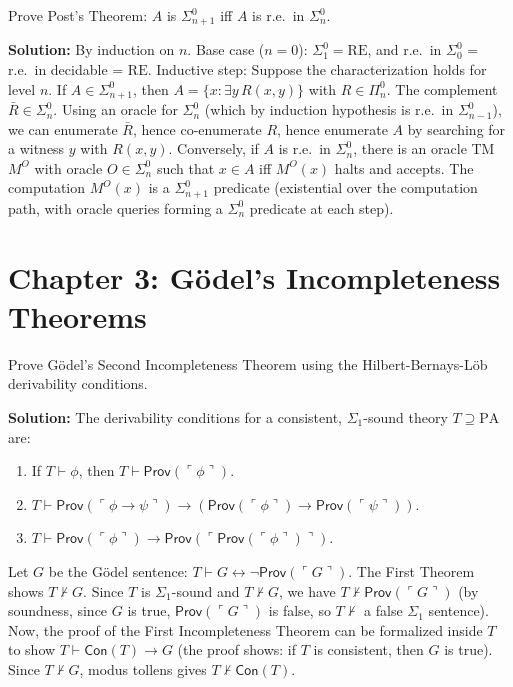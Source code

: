 \begin{exercise}[Challenge]
Prove Post's Theorem: $A$ is $\Sigma_{n+1}^0$ iff $A$ is r.e.\ in $\Sigma_n^0$.
\end{exercise}
\textbf{Solution:} By induction on $n$. Base case ($n=0$): $\Sigma_1^0 = \mathrm{RE}$, and r.e.\ in $\Sigma_0^0$ = r.e.\ in decidable = $\mathrm{RE}$. Inductive step: Suppose the characterization holds for level $n$. If $A \in \Sigma_{n+1}^0$, then $A = \{x : \exists y \, R(x,y)\}$ with $R \in \Pi_n^0$. The complement $\bar{R} \in \Sigma_n^0$. Using an oracle for $\Sigma_n^0$ (which by induction hypothesis is r.e.\ in $\Sigma_{n-1}^0$), we can enumerate $\bar{R}$, hence co-enumerate $R$, hence enumerate $A$ by searching for a witness $y$ with $R(x,y)$. Conversely, if $A$ is r.e.\ in $\Sigma_n^0$, there is an oracle TM $M^O$ with oracle $O \in \Sigma_n^0$ such that $x \in A$ iff $M^O(x)$ halts and accepts. The computation $M^O(x)$ is a $\Sigma_{n+1}^0$ predicate (existential over the computation path, with oracle queries forming a $\Sigma_n^0$ predicate at each step).

\section{Chapter 3: G\"odel's Incompleteness Theorems}

\begin{exercise}[Intermediate]
Prove G\"odel's Second Incompleteness Theorem using the Hilbert-Bernays-L\"ob derivability conditions.
\end{exercise}
\textbf{Solution:} The derivability conditions for a consistent, $\Sigma_1$-sound theory $T \supseteq \mathrm{PA}$ are:
\begin{enumerate}
\item If $T \vdash \phi$, then $T \vdash \mathsf{Prov}(\ulcorner \phi \urcorner)$.
\item $T \vdash \mathsf{Prov}(\ulcorner \phi \to \psi \urcorner) \to (\mathsf{Prov}(\ulcorner \phi \urcorner) \to \mathsf{Prov}(\ulcorner \psi \urcorner))$.
\item $T \vdash \mathsf{Prov}(\ulcorner \phi \urcorner) \to \mathsf{Prov}(\ulcorner \mathsf{Prov}(\ulcorner \phi \urcorner) \urcorner)$.
\end{enumerate}
Let $G$ be the G\"odel sentence: $T \vdash G \leftrightarrow \neg \mathsf{Prov}(\ulcorner G \urcorner)$. The First Theorem shows $T \nvdash G$. Since $T$ is $\Sigma_1$-sound and $T \nvdash G$, we have $T \nvdash \mathsf{Prov}(\ulcorner G \urcorner)$ (by soundness, since $G$ is true, $\mathsf{Prov}(\ulcorner G \urcorner)$ is false, so $T \nvdash$ a false $\Sigma_1$ sentence). Now, the proof of the First Incompleteness Theorem can be formalized inside $T$ to show $T \vdash \mathsf{Con}(T) \to G$ (the proof shows: if $T$ is consistent, then $G$ is true). Since $T \nvdash G$, modus tollens gives $T \nvdash \mathsf{Con}(T)$.

